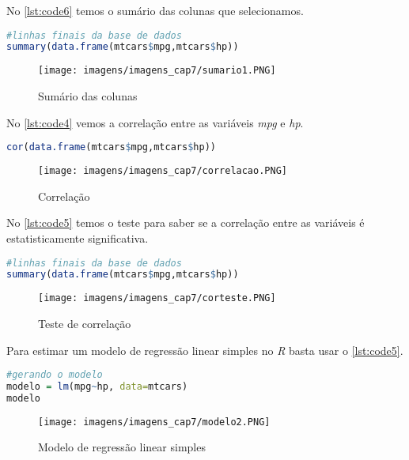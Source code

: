 \newpage

\noindent No \autoref{lst:code6} temos o sumário das colunas que selecionamos.

\begin{lstlisting}[language=R, caption = {Sumário das variáveis},label={lst:code6}]
#linhas finais da base de dados
summary(data.frame(mtcars$mpg,mtcars$hp))
\end{lstlisting}

\begin{figure}[H]
\centering
\caption{Sumário das colunas}
\texttt{[image: imagens/imagens\_cap7/sumario1.PNG]}
\label{fig:modelo4}
\end{figure}

\noindent No \autoref{lst:code4} vemos a correlação entre as variáveis \textit{mpg} e \textit{hp}.

\begin{lstlisting}[language=R, caption = {Tabela de correlação},label={lst:code4}]
cor(data.frame(mtcars$mpg,mtcars$hp))
\end{lstlisting}

\begin{figure}[H]
\centering
\caption{Correlação}
\texttt{[image: imagens/imagens\_cap7/correlacao.PNG]}
\label{fig:modelo4}
\end{figure}

\noindent No \autoref{lst:code5} temos o teste para saber se a correlação entre as variáveis é estatisticamente significativa.

\begin{lstlisting}[language=R, caption = {Sumário das variáveis},label={lst:code5}]
#linhas finais da base de dados
summary(data.frame(mtcars$mpg,mtcars$hp))
\end{lstlisting}

\begin{figure}[H]
\centering
\caption{Teste de correlação}
\texttt{[image: imagens/imagens\_cap7/corteste.PNG]}
\label{fig:modelo4}
\end{figure}

\noindent Para estimar um modelo de regressão linear simples no \textit{R} basta usar o \autoref{lst:code5}.

\begin{lstlisting}[language=R, caption = {Modelo de regressão},label={lst:code7}]
#gerando o modelo
modelo = lm(mpg~hp, data=mtcars)
modelo
\end{lstlisting}

\begin{figure}[H]
\centering
\caption{Modelo de regressão linear simples}
\texttt{[image: imagens/imagens\_cap7/modelo2.PNG]}
\label{fig:modelo5}
\end{figure}

